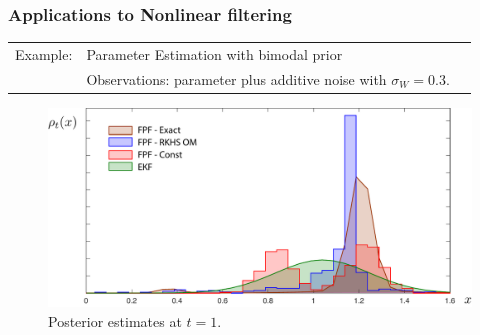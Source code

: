 \documentclass[xcolor=dvipsnames, subsection=false]{beamer}
\def\alertb#1{\alert{\color{BrickRed}  #1}}
\def\alertb#1{\alert{\color{BrickRed}  #1}}
\begin{document}
\begin{frame}
\begin{minipage}[t][6.5cm][t]{\textwidth}
\end{minipage}
\end{frame}

\begin{frame}
\frametitle{Applications to Nonlinear filtering}

\begin{minipage}[t][6.5cm][t]{\textwidth}
	
	\begin{tabular}{lll}\alertb{Example:}   & Parameter Estimation with bimodal prior
		\\
		&   Observations:  parameter plus additive noise with $\sigma_W = 0.3$.
	\end{tabular}
	\centering
	\begin{figure}
    \includegraphics[width= .6\hsize]{param_est_posterior_comparison.pdf}  	
	\caption{Posterior estimates at $t=1$.}
	\end{figure}
\end{minipage}
\end{frame}
\end{document}
